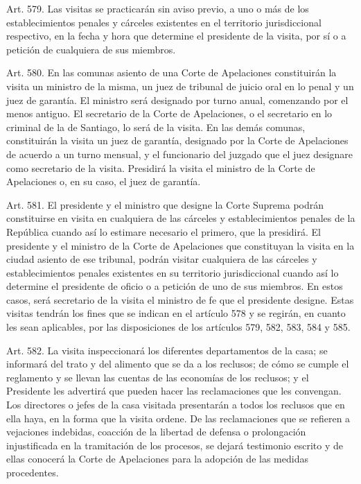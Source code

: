     Art. 579. Las visitas se practicarán sin aviso previo, a uno o más de los establecimientos penales y cárceles existentes en el territorio jurisdiccional respectivo, en la fecha y hora que determine el presidente de la visita, por sí o a petición de cualquiera de sus miembros.



    Art. 580. En las comunas asiento de una Corte de Apelaciones constituirán la visita un ministro de la misma, un juez de tribunal de juicio oral en lo penal y un juez de garantía. El ministro será designado por turno anual, comenzando por el menos antiguo.
    El secretario de la Corte de Apelaciones, o el secretario en lo criminal de la de Santiago, lo será de la visita.
    En las demás comunas, constituirán la visita un juez de garantía, designado por la Corte de Apelaciones de acuerdo a un turno mensual, y el funcionario del juzgado que el juez designare como secretario de la visita.
    Presidirá la visita el ministro de la Corte de Apelaciones o, en su caso, el juez de garantía.


    Art. 581. El presidente y el ministro que designe la Corte Suprema podrán constituirse en visita en cualquiera de las cárceles y establecimientos penales de la República cuando así lo estimare necesario el primero, que la presidirá.
    El presidente y el ministro de la Corte de Apelaciones que constituyan la visita en la ciudad asiento de ese tribunal, podrán visitar cualquiera de las cárceles y establecimientos penales existentes en su territorio jurisdiccional cuando así lo determine el presidente de oficio o a petición de uno de sus miembros.
    En estos casos, será secretario de la visita el ministro de fe que el presidente designe.
    Estas visitas tendrán los fines que se indican en el artículo 578 y se regirán, en cuanto les sean aplicables, por las disposiciones de los artículos 579, 582, 583, 584 y 585.



    Art. 582. La visita inspeccionará los diferentes departamentos de la casa; se informará del trato y del alimento que se da a los reclusos; de cómo se cumple el reglamento y se llevan las cuentas de las economías de los reclusos; y el Presidente les advertirá que pueden hacer las reclamaciones que les convengan.
    Los directores o jefes de la casa visitada presentarán a todos los reclusos que en ella haya, en la forma que la visita ordene.
    De las reclamaciones que se refieren a vejaciones indebidas, coacción de la libertad de defensa o prolongación injustificada en la tramitación de los procesos, se dejará testimonio escrito y de ellas conocerá la Corte de Apelaciones para la adopción de las medidas procedentes.



